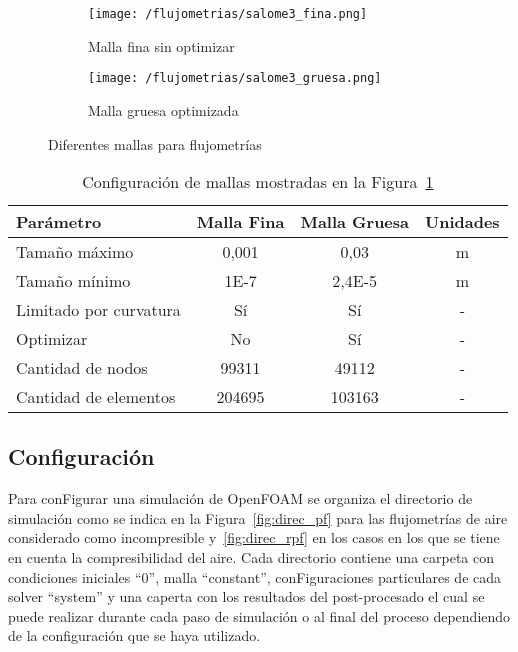 \begin{figure}[t!]
    \centering
    \begin{subfigure}[t]{0.5\textwidth}
        \centering
        \texttt{[image: /flujometrias/salome3\_fina.png]}
        \caption{Malla fina sin optimizar}
    \end{subfigure}%
    \begin{subfigure}[t]{0.5\textwidth}
        \centering
        \texttt{[image: /flujometrias/salome3\_gruesa.png]}
        \caption{Malla gruesa optimizada}
    \end{subfigure}
    \caption{Diferentes mallas para flujometrías}\label{fig:salome_fina_gruesa}
\end{figure}

\begin{table}
    \centering
    \begin{tabular}{lccc} \toprule
        Parámetro                & Malla Fina    & Malla Gruesa     & Unidades\\ \midrule
        Tamaño máximo            & 0,001         & 0,03             & m \\
        Tamaño mínimo            & 1E-7          & 2,4E-5           & m \\
        Limitado por curvatura   & Sí            & Sí               & - \\
        Optimizar                & No            & Sí               & - \\
        Cantidad de nodos        & 99311         & 49112            & - \\
        Cantidad de elementos    & 204695        & 103163           & - \\ \bottomrule
    \end{tabular}
    \caption{Configuración de mallas mostradas en la Figura~\ref{fig:salome_fina_gruesa}}
    \label{tab:salome_fina_gruesa}
\end{table}


\subsection{Configuración}
%
Para conFigurar una simulación de OpenFOAM se organiza el directorio de
simulación como se indica en la Figura~\ref{fig:direc_pf} para las flujometrías
de aire considerado como incompresible  y~\ref{fig:direc_rpf} en los casos en
los que se tiene en cuenta la compresibilidad del aire.
%
Cada directorio contiene una carpeta con condiciones iniciales ``0'', malla
``constant'', conFiguraciones particulares de cada solver ``system'' y una
caperta con los resultados del post-procesado el cual se puede realizar
durante cada paso de simulación o al final del proceso dependiendo de la
configuración que se haya utilizado.

